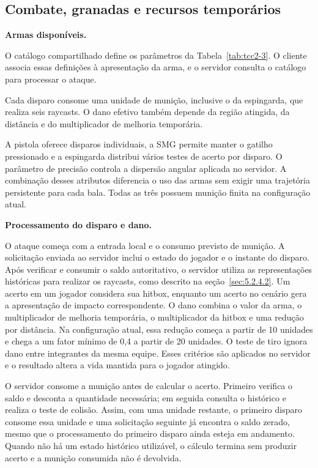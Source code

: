 \subsection{Combate, granadas e recursos temporários}\label{sec:5.2.8}

\textbf{Armas disponíveis.}

O catálogo compartilhado define os parâmetros da Tabela~\ref{tab:tcc2-3}. O cliente associa essas definições à apresentação da arma, e o servidor consulta o catálogo para processar o ataque.

Cada disparo consome uma unidade de munição, inclusive o da espingarda, que realiza seis raycasts. O dano efetivo também depende da região atingida, da distância e do multiplicador de melhoria temporária.

A pistola oferece disparos individuais, a SMG permite manter o gatilho pressionado e a espingarda distribui vários testes de acerto por disparo. O parâmetro de precisão controla a dispersão angular aplicada no servidor. A combinação desses atributos diferencia o uso das armas sem exigir uma trajetória persistente para cada bala. Todas as três possuem munição finita na configuração atual.

\newpage
\textbf{Processamento do disparo e dano.}

O ataque começa com a entrada local e o consumo previsto de munição. A solicitação enviada ao servidor inclui o estado do jogador e o instante do disparo. Após verificar e consumir o saldo autoritativo, o servidor utiliza as representações históricas para realizar os raycasts, como descrito na seção~\ref{sec:5.2.4.2}. Um acerto em um jogador considera sua hitbox, enquanto um acerto no cenário gera a apresentação de impacto correspondente.
O dano combina o valor da arma, o multiplicador de melhoria temporária, o multiplicador da hitbox e uma redução por distância. Na configuração atual, essa redução começa a partir de 10 unidades e chega a um fator mínimo de 0,4 a partir de 20 unidades. O teste de tiro ignora dano entre integrantes da mesma equipe. Esses critérios são aplicados no servidor e o resultado altera a vida mantida para o jogador atingido.

O servidor consome a munição antes de calcular o acerto. Primeiro verifica o saldo e desconta a quantidade necessária; em seguida consulta o histórico e realiza o teste de colisão. Assim, com uma unidade restante, o primeiro disparo consome essa unidade e uma solicitação seguinte já encontra o saldo zerado, mesmo que o processamento do primeiro disparo ainda esteja em andamento. Quando não há um estado histórico utilizável, o cálculo termina sem produzir acerto e a munição consumida não é devolvida.

